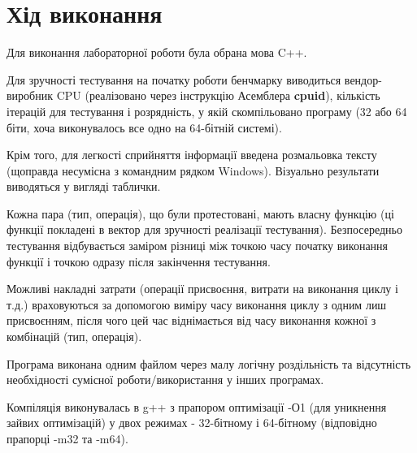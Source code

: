 \section{Хід виконання}

Для виконання лабораторної роботи була обрана мова C++. 

Для зручності тестування на початку роботи бенчмарку виводиться вендор-виробник CPU (реалізовано через інструкцію Асемблера \textbf{cpuid}), кількість ітерацій для тестування і розрядність, у якій скомпільовано програму (32 або 64 біти, хоча виконувалось все одно на 64-бітній системі).

Крім того, для легкості сприйняття інформації введена розмальовка тексту (щоправда несумісна з командним рядком Windows). Візуально результати виводяться у вигляді таблички.

Кожна пара (тип, операція), що були протестовані, мають власну функцію (ці функції покладені в вектор для зручності реалізації тестування). Безпосередньо тестування відбувається заміром різниці між точкою часу початку виконання функції і точкою одразу після закінчення тестування. 

Можливі накладні затрати (операції присвоєння, витрати на виконання циклу і т.д.) враховуються за допомогою виміру часу виконання циклу з одним лиш присвоєнням, після чого цей час віднімається від часу виконання кожної з комбінацій (тип, операція).

Програма виконана одним файлом через малу логічну роздільність та відсутність необхідності сумісної роботи/використання у інших програмах.

Компіляція виконувалась в g++ з прапором оптимізації -О1 (для уникнення зайвих оптимізацій) у двох режимах - 32-бітному і 64-бітному (відповідно прапорці -m32 та -m64). 
 
